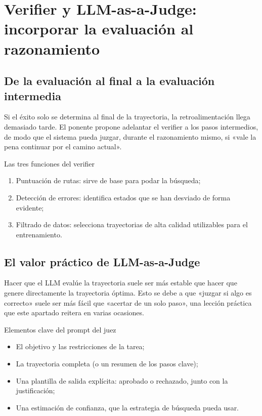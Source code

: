 \section{Verifier y LLM-as-a-Judge: incorporar la evaluación al razonamiento}

\subsection{De la evaluación al final a la evaluación intermedia}
Si el éxito solo se determina al final de la trayectoria, la retroalimentación llega demasiado tarde. El ponente propone adelantar el verifier a los pasos intermedios, de modo que el sistema pueda juzgar, durante el razonamiento mismo, si «vale la pena continuar por el camino actual».

\begin{importantbox}{Las tres funciones del verifier}
\begin{enumerate}
    \item Puntuación de rutas: sirve de base para podar la búsqueda;
    \item Detección de errores: identifica estados que se han desviado de forma evidente;
    \item Filtrado de datos: selecciona trayectorias de alta calidad utilizables para el entrenamiento.
\end{enumerate}
\end{importantbox}

\subsection{El valor práctico de LLM-as-a-Judge}
Hacer que el LLM evalúe la trayectoria suele ser más estable que hacer que genere directamente la trayectoria óptima. Esto se debe a que «juzgar si algo es correcto» suele ser más fácil que «acertar de un solo paso», una lección práctica que este apartado reitera en varias ocasiones.

\begin{knowledgebox}{Elementos clave del prompt del juez}
\begin{itemize}
    \item El objetivo y las restricciones de la tarea;
    \item La trayectoria completa (o un resumen de los pasos clave);
    \item Una plantilla de salida explícita: aprobado o rechazado, junto con la justificación;
    \item Una estimación de confianza, que la estrategia de búsqueda pueda usar.
\end{itemize}
\end{knowledgebox}

